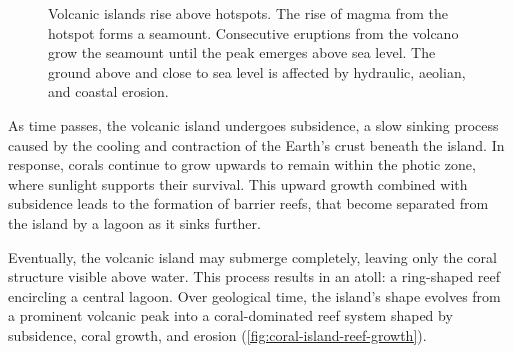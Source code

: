 
\begin{figure}[H]
    \caption{Volcanic islands rise above hotspots. The rise of magma from the hotspot forms a seamount. Consecutive eruptions from the volcano grow the seamount until the peak emerges above sea level. The ground above and close to sea level is affected by hydraulic, aeolian, and coastal erosion.}
    \label{fig:coral-island-island-growth}
\end{figure}

As time passes, the volcanic island undergoes subsidence, a slow sinking process caused by the cooling and contraction of the Earth's crust beneath the island. In response, corals continue to grow upwards to remain within the photic zone, where sunlight supports their survival. This upward growth combined with subsidence leads to the formation of barrier reefs, that become separated from the island by a lagoon as it sinks further.

Eventually, the volcanic island may submerge completely, leaving only the coral structure visible above water. This process results in an atoll: a ring-shaped reef encircling a central lagoon. Over geological time, the island's shape evolves from a prominent volcanic peak into a coral-dominated reef system shaped by subsidence, coral growth, and erosion (\cref{fig:coral-island-reef-growth}).

